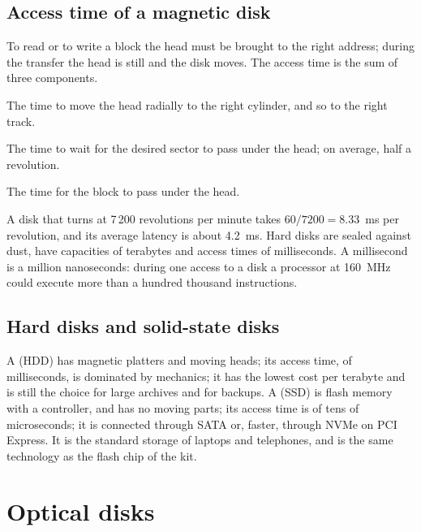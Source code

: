 \subsection{Access time of a magnetic disk}

To read or to write a block the head must be brought to the right address;
during the transfer the head is still and the disk moves. The access time is
the sum of three components.

\begin{description}[style=nextline,leftmargin=1.5em]
\item[Seek time.] The time to move the head radially to the right cylinder,
  and so to the right track.
\item[Latency.] The time to wait for the desired sector to pass under the
  head; on average, half a revolution.
\item[Transfer time.] The time for the block to pass under the head.
\end{description}

A disk that turns at 7\,200 revolutions per minute takes $60/7200 = 8.33$~ms
per revolution, and its average latency is about 4.2~ms. Hard disks are
sealed against dust, have capacities of terabytes and access times of
milliseconds. A millisecond is a million nanoseconds: during one access to a
disk a processor at 160~MHz could execute more than a hundred thousand
instructions.

\subsection{Hard disks and solid-state disks}

A  (HDD) has magnetic platters and moving heads; its
access time, of milliseconds, is dominated by mechanics; it has the lowest
cost per terabyte and is still the choice for large archives and for backups.
A  (SSD) is flash memory with a controller, and has no
moving parts; its access time is of tens of microseconds; it is connected
through SATA or, faster, through NVMe on PCI Express. It is the standard
storage of laptops and telephones, and is the same technology as the flash
chip of the kit.

\section{Optical disks}

